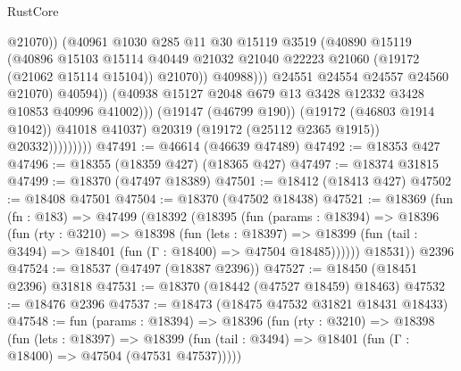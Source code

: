 \begin{lexlean}{RustCore}
\begin{coremodule}
                                          @21070))
                                      (@40961
                                        @1030
                                        @285
                                        @11
                                        @30
                                        @15119
                                        @3519
                                        (@40890
                                          @15119
                                          (@40896
                                            @15103
                                            @15114
                                            @40449
                                            @21032
                                            @21040
                                            @22223
                                            @21060
                                            (@19172 (@21062 @15114 @15104))
                                            @21070))
                                        @40988)))
                                  @24551
                                  @24554
                                  @24557
                                  @24560
                                  @21070)
                                @40594))
                            (@40938 @15127 @2048 @679 @13 @3428 @12332 @3428 @10853 @40996 @41002)))
                        (@19147 (@46799 @190))
                        (@19172 (@46803 @1914 @1042))
                        @41018
                        @41037)
                      @20319
                      (@19172 (@25112 @2365 @1915))
                      @20332)))))))))
@47491 := @46614 (@46639 @47489)
@47492 := @18353 @427
@47496 := @18355 (@18359 @427) (@18365 @427)
@47497 := @18374 @31815
@47499 := @18370 (@47497 @18389)
@47501 := @18412 (@18413 @427)
@47502 := @18408 @47501
@47504 := @18370 (@47502 @18438)
@47521 := @18369
    (fun (fn : @183) =>
    @47499
      (@18392
        (@18395
          (fun (params : @18394) =>
          @18396
            (fun (rty : @3210) =>
            @18398
              (fun (lets : @18397) =>
              @18399 (fun (tail : @3494) => @18401 (fun (Γ : @18400) => @47504 @18485))))))
        @18531))
    @2396
@47524 := @18537 (@47497 (@18387 @2396))
@47527 := @18450 (@18451 @2396) @31818
@47531 := @18370 (@18442 (@47527 @18459) @18463)
@47532 := @18476 @2396
@47537 := @18473 (@18475 @47532 @31821 @18431 @18433)
@47548 := fun (params : @18394) =>
  @18396
    (fun (rty : @3210) =>
    @18398
      (fun (lets : @18397) =>
      @18399 (fun (tail : @3494) => @18401 (fun (Γ : @18400) => @47504 (@47531 @47537)))))

\end{coremodule}
\end{lexlean}
